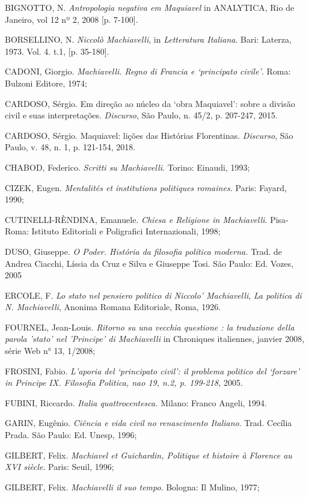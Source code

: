 \begin{Parskip}
BIGNOTTO, N. \emph{Antropologia negativa em Maquiavel} in ANALYTICA, Rio
de Janeiro, vol 12 nº 2, 2008 {[}p. 7-100{]}.

BORSELLINO, N. \emph{Niccolò Machiavelli}, in \emph{Letteratura
Italiana}. Bari: Laterza, 1973. Vol. 4. t.1, {[}p. 35-180{]}.

CADONI, Giorgio. \emph{Machiavelli. Regno di Francia e `principato
civile'}. Roma: Bulzoni Editore, 1974;

CARDOSO, Sérgio. Em direção ao núcleo da `obra Maquiavel': sobre a
divisão civil e suas interpretações. \emph{Discurso}, São Paulo, n.
45/2, p. 207-247, 2015.

CARDOSO, Sérgio. Maquiavel: lições das Histórias Florentinas.
\emph{Discurso}, São Paulo, v. 48, n. 1, p. 121-154, 2018.

CHABOD, Federico. \emph{Scritti su Machiavelli}. Torino: Einaudi, 1993;

CIZEK, Eugen. \emph{Mentalités et institutions politiques romaines.}
Paris: Fayard, 1990;

CUTINELLI-RÈNDINA, Emanuele. \emph{Chiesa e Religione in Machiavelli}.
Pisa-Roma: Istituto Editoriali e Poligrafici Internazionali, 1998;

DUSO, Giuseppe. \emph{O Poder. História da filosofia política moderna.}
Trad. de Andrea Ciacchi, Líssia da Cruz e Silva e Giuseppe Tosi. São
Paulo: Ed. Vozes, 2005

ERCOLE, F. \emph{Lo stato nel pensiero politico di Niccolo'
Machiavelli}, \emph{La politica di N. Machiavelli}, Anonima Romana
Editoriale, Roma, 1926.

FOURNEL, Jean-Louis. \emph{Ritorno su una vecchia questione : la
traduzione della parola 'stato' nel 'Principe' di Machiavelli} in
Chroniques italiennes, janvier 2008, série Web n° 13, 1/2008;

FROSINI, Fabio. \emph{L'aporia del `principato civil': il problema
politico del `forzare' in Principe IX. Filosofia Politica, nao 19, n.2,
p. 199-218,} 2005.

FUBINI, Riccardo. \emph{Italia quattrocentesca.} Milano: Franco Angeli,
1994.

GARIN, Eugênio. \emph{Ciência e vida civil no renascimento Italiano}.
Trad. Cecília Prada. São Paulo: Ed. Unesp, 1996;

GILBERT, Felix. \emph{Machiavel et Guichardin, Politique et histoire à
Florence au XVI siècle}. Paris: Seuil, 1996;

GILBERT, Felix. \emph{Machiavelli il suo tempo}. Bologna: Il Mulino,
1977;


\end{Parskip}
